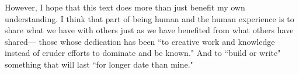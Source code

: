 \begin{personal}
  However, I hope that this text does more than just benefit my own 
  understanding.
  I think that part of being human and the human experience is to share
  what we have with others just as we have benefited from what 
  others have shared---
  those whose dedication has been 
  ``to creative work and knowledge instead of cruder efforts to dominate and be 
   known."
  And to ``build or write" something that will last ``for longer date than mine."

%
%
%

\end{personal}
